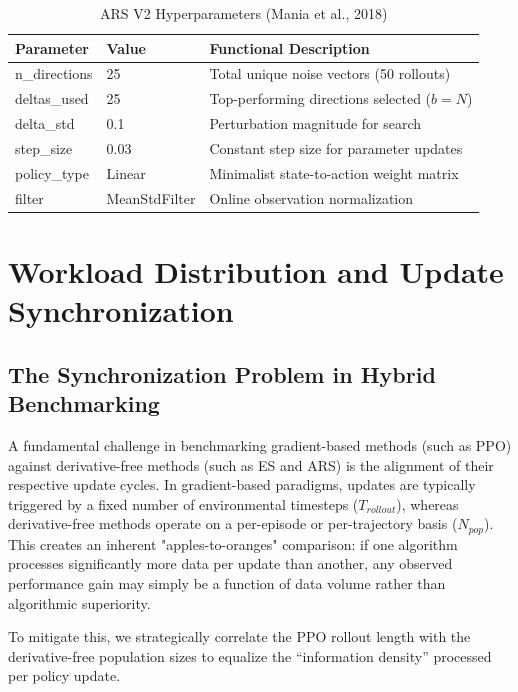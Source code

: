 \begin{table}[htbp]
\centering
\caption{ARS V2 Hyperparameters (Mania et al., 2018)}
\label{tab:ars_hyperparameters}
\begin{tabular}{lll}
\toprule
\textbf{Parameter} & \textbf{Value} & \textbf{Functional Description} \\
\midrule
n\_directions & 25     & Total unique noise vectors (50 rollouts) \\
deltas\_used  & 25     & Top-performing directions selected ($b = N$) \\
delta\_std    & 0.1    & Perturbation magnitude for search \\
step\_size    & 0.03   & Constant step size for parameter updates \\
policy\_type  & Linear & Minimalist state-to-action weight matrix \\
filter        & MeanStdFilter & Online observation normalization \\
\bottomrule
\end{tabular}
\end{table}


\section{Workload Distribution and Update Synchronization}

\subsection{The Synchronization Problem in Hybrid Benchmarking}
A fundamental challenge in benchmarking gradient-based methods (such as PPO) against derivative-free methods (such as ES and ARS) is the alignment of their respective update cycles. In gradient-based paradigms, updates are typically triggered by a fixed number of environmental timesteps ($T_{rollout}$), whereas derivative-free methods operate on a per-episode or per-trajectory basis ($N_{pop}$). This creates an inherent "apples-to-oranges" comparison: if one algorithm processes significantly more data per update than another, any observed performance gain may simply be a function of data volume rather than algorithmic superiority.

To mitigate this, we strategically correlate the PPO rollout length with the derivative-free population sizes to equalize the ``information density'' processed per policy update.

